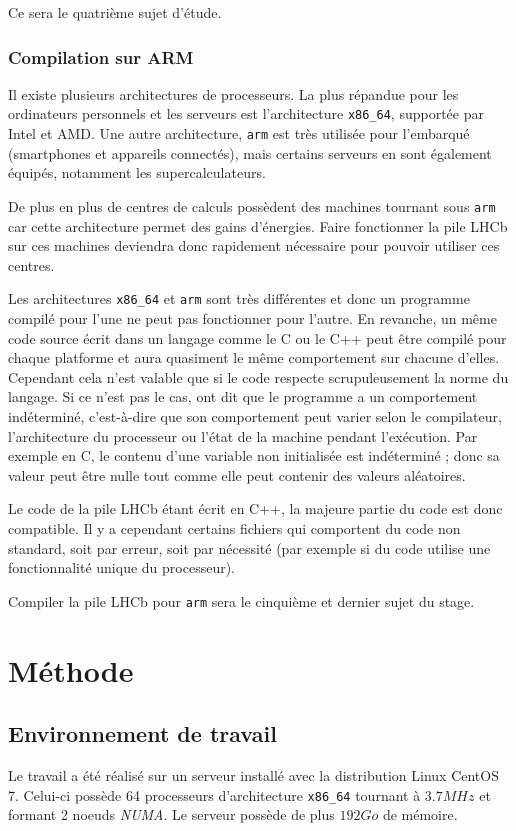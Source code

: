 \documentclass[a4paper,11pt]{report}
\begin{document}
\bigskip
Ce sera le quatrième sujet d'étude.

\subsection{Compilation sur ARM}\label{section:arm}
Il existe plusieurs architectures de processeurs.
La plus répandue pour les ordinateurs personnels et les serveurs est l'architecture \verb'x86_64', supportée par Intel et AMD.
Une autre architecture, \verb'arm' est très utilisée pour l'embarqué (smartphones et appareils connectés), mais certains serveurs en sont également équipés, notamment les supercalculateurs.

De plus en plus de centres de calculs possèdent des machines tournant sous \verb'arm' car cette architecture permet des gains d'énergies.
Faire fonctionner la pile LHCb sur ces machines deviendra donc rapidement nécessaire pour pouvoir utiliser ces centres.

Les architectures \verb'x86_64' et \verb'arm' sont très différentes et donc un programme compilé pour l'une ne peut pas fonctionner pour l'autre.
En revanche, un même code source écrit dans un langage comme le C ou le C++ peut être compilé pour chaque platforme et aura quasiment le même comportement sur chacune d'elles.
Cependant cela n'est valable que si le code respecte scrupuleusement la norme du langage.
Si ce n'est pas le cas, ont dit que le programme a un comportement indéterminé, c'est-à-dire que son comportement peut varier selon le compilateur, l'architecture du processeur ou l'état de la machine pendant l'exécution.
Par exemple en C, le contenu d'une variable non initialisée est indéterminé ; donc sa valeur peut être nulle tout comme elle peut contenir des valeurs aléatoires.

Le code de la pile LHCb étant écrit en C++, la majeure partie du code est donc compatible.
Il y a cependant certains fichiers qui comportent du code non standard, soit par erreur, soit par nécessité (par exemple si du code utilise une fonctionnalité unique du processeur).

\bigskip
Compiler la pile LHCb pour \verb'arm' sera le cinquième et dernier sujet du stage.


\chapter{Méthode}
\section{Environnement de travail}
Le travail a été réalisé sur un serveur installé avec la distribution Linux CentOS 7.
Celui-ci possède 64 processeurs d'architecture \verb'x86_64' tournant à $3.7 MHz$ et formant 2 noeuds \emph{NUMA}.
Le serveur possède de plus $192 Go$ de mémoire.
\end{document}
